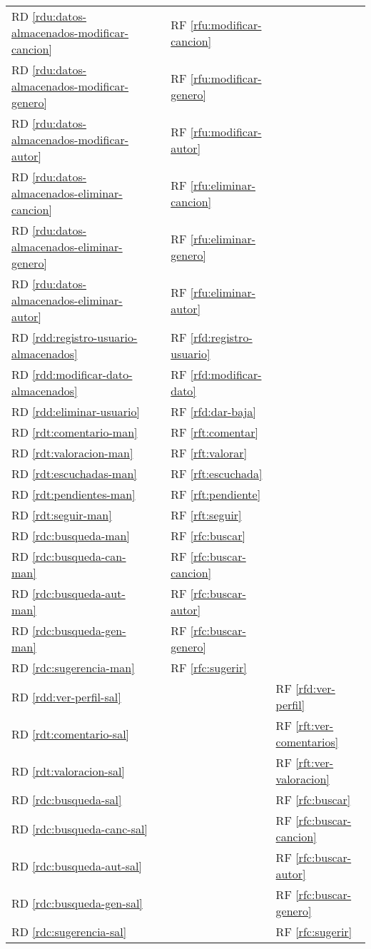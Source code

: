\documentclass[
  12pt,
  a4paper,
  DIV=12,
  spanish,
]{scrartcl}
\newcounter{RF}
\newcounter{RD}
\begin{document}
\begin{tabularx}{\linewidth}{l|XXX}
  RD \ref{rdu:datos-almacenados-modificar-cancion} & & RF \ref{rfu:modificar-cancion} & \\
  RD \ref{rdu:datos-almacenados-modificar-genero} & & RF \ref{rfu:modificar-genero} & \\
  RD \ref{rdu:datos-almacenados-modificar-autor} & & RF \ref{rfu:modificar-autor} &\\
  RD \ref{rdu:datos-almacenados-eliminar-cancion} & & RF \ref{rfu:eliminar-cancion} & \\
  RD \ref{rdu:datos-almacenados-eliminar-genero}&  & RF \ref{rfu:eliminar-genero} & \\
  RD \ref{rdu:datos-almacenados-eliminar-autor} & & RF \ref{rfu:eliminar-autor} &\\

  RD \ref{rdd:registro-usuario-almacenados} & & RF \ref{rfd:registro-usuario} & \\
  RD \ref{rdd:modificar-dato-almacenados} & & RF \ref{rfd:modificar-dato} & \\
  RD \ref{rdd:eliminar-usuario} & & RF \ref{rfd:dar-baja} & \\
  RD \ref{rdt:comentario-man} & & RF \ref{rft:comentar} & \\
  RD \ref{rdt:valoracion-man} & & RF \ref{rft:valorar} & \\
  RD \ref{rdt:escuchadas-man} & & RF \ref{rft:escuchada} & \\
  RD \ref{rdt:pendientes-man} & & RF \ref{rft:pendiente} & \\
  RD \ref{rdt:seguir-man} & & RF \ref{rft:seguir} & \\
  RD \ref{rdc:busqueda-man} && RF \ref{rfc:buscar} & \\
  RD \ref{rdc:busqueda-can-man} && RF \ref{rfc:buscar-cancion} & \\
  RD \ref{rdc:busqueda-aut-man} && RF \ref{rfc:buscar-autor} & \\
  RD \ref{rdc:busqueda-gen-man} && RF \ref{rfc:buscar-genero} & \\
  RD \ref{rdc:sugerencia-man} && RF \ref{rfc:sugerir} & \\


  RD \ref{rdd:ver-perfil-sal} & & & RF \ref{rfd:ver-perfil} \\
  RD \ref{rdt:comentario-sal} & & & RF \ref{rft:ver-comentarios} \\
  RD \ref{rdt:valoracion-sal} & & & RF \ref{rft:ver-valoracion} \\
  RD \ref{rdc:busqueda-sal} & & & RF \ref{rfc:buscar} \\
  RD \ref{rdc:busqueda-canc-sal} & & & RF \ref{rfc:buscar-cancion} \\
  RD \ref{rdc:busqueda-aut-sal} & & & RF \ref{rfc:buscar-autor} \\
  RD \ref{rdc:busqueda-gen-sal} & & & RF \ref{rfc:buscar-genero} \\
  RD \ref{rdc:sugerencia-sal} & & & RF \ref{rfc:sugerir} \\

\end{tabularx}
\end{document}
